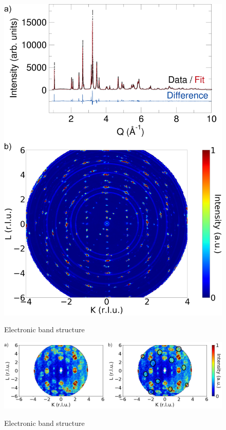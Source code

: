 \documentclass[11pt,edeposit,draftthesis]{uiucthesis2020}
\begin{document}
\begin{mainmatter}
\begin{figure}
\centering\includegraphics[width=\columnwidth]{figures/ch8/11BM_refinement_elastic_slice.png} \\
\caption{\label{fig:11BM_elastic_slice}
Electronic band structure
}
\end{figure}

\begin{figure}
\centering\includegraphics[width=0.7\columnwidth]{figures/ch8/suppl_misaligned_crystal_kl_slice.png} \\
\caption{\label{fig:misalign_crystal}
Electronic band structure
}
\end{figure}


\end{mainmatter}
\end{document}
